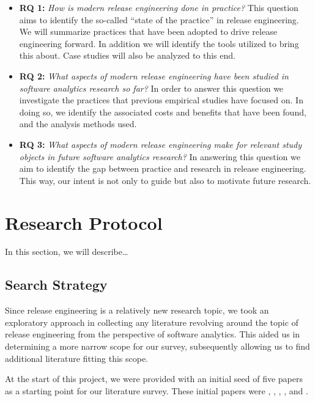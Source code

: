 \documentclass[]{book}
\begin{document}
\begin{itemize}
\item
  \textbf{RQ 1:} \emph{How is modern release engineering done in
  practice?} This question aims to identify the so-called ``state of the
  practice'' in release engineering. We will summarize practices that
  have been adopted to drive release engineering forward. In addition we
  will identify the tools utilized to bring this about. Case studies
  will also be analyzed to this end.
\item
  \textbf{RQ 2:} \emph{What aspects of modern release engineering have
  been studied in software analytics research so far?} In order to
  answer this question we investigate the practices that previous
  empirical studies have focused on. In doing so, we identify the
  associated costs and benefits that have been found, and the analysis
  methods used.
\item
  \textbf{RQ 3:} \emph{What aspects of modern release engineering make
  for relevant study objects in future software analytics research?} In
  answering this question we aim to identify the gap between practice
  and research in release engineering. This way, our intent is not only
  to guide but also to motivate future research.
\end{itemize}

\section{Research Protocol}\label{research-protocol-4}

In this section, we will describe\ldots{}

\subsection{Search Strategy}\label{search-strategy}

Since release engineering is a relatively new research topic, we took an
exploratory approach in collecting any literature revolving around the
topic of release engineering from the perspective of software analytics.
This aided us in determining a more narrow scope for our survey,
subsequently allowing us to find additional literature fitting this
scope.

At the start of this project, we were provided with an initial seed of
five papers as a starting point for our literature survey. These initial
papers were \citet{adams2016a}, \citet{da2016a}, \citet{d2014a},
\citet{khomh2012a}, and \citet{khomh2015a}.
\end{document}
